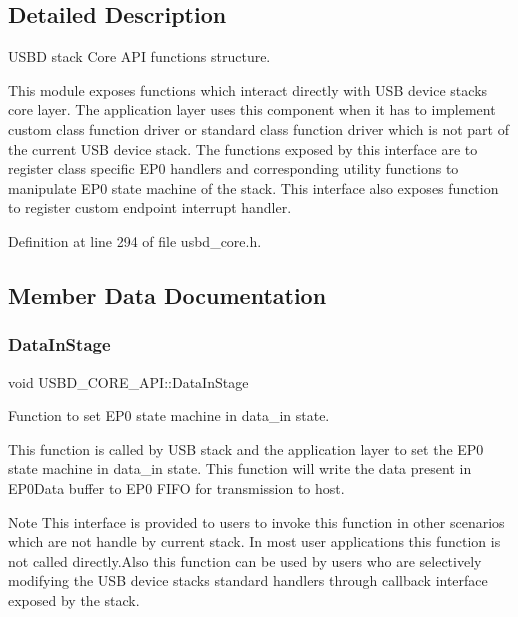 \subsection{Detailed Description}
U\+S\+BD stack Core A\+PI functions structure. 

This module exposes functions which interact directly with U\+SB device stack\textquotesingle{}s core layer. The application layer uses this component when it has to implement custom class function driver or standard class function driver which is not part of the current U\+SB device stack. The functions exposed by this interface are to register class specific E\+P0 handlers and corresponding utility functions to manipulate E\+P0 state machine of the stack. This interface also exposes function to register custom endpoint interrupt handler. 

Definition at line 294 of file usbd\+\_\+core.\+h.



\subsection{Member Data Documentation}
\mbox{\label{struct_u_s_b_d___c_o_r_e___a_p_i_abe1068288a0eb073f7c9eee1466d4fae}} 
\subsubsection{\texorpdfstring{Data\+In\+Stage}{DataInStage}}
{\footnotesize\ttfamily void U\+S\+B\+D\+\_\+\+C\+O\+R\+E\+\_\+\+A\+P\+I\+::\+Data\+In\+Stage}

Function to set E\+P0 state machine in data\+\_\+in state.

This function is called by U\+SB stack and the application layer to set the E\+P0 state machine in data\+\_\+in state. This function will write the data present in E\+P0\+Data buffer to E\+P0 F\+I\+FO for transmission to host. ~\newline
\begin{DoxyNote}{Note}
This interface is provided to users to invoke this function in other scenarios which are not handle by current stack. In most user applications this function is not called directly.\+Also this function can be used by users who are selectively modifying the U\+SB device stack\textquotesingle{}s standard handlers through callback interface exposed by the stack.
\end{DoxyNote}

